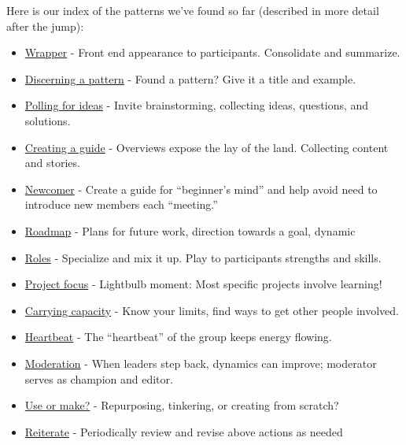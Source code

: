 Here is our index of the patterns we've found so far (described in more
detail after the jump):

\begin{itemize}
\item
  \href{http://peeragogy.org/patterns/wrapper/}{Wrapper} - Front end
  appearance to participants. Consolidate and summarize.
\item
  \href{http://peeragogy.org/patterns/discerning-a-pattern/}{Discerning
  a pattern} - Found a pattern? Give it a title and example.
\item
  \href{http://peeragogy.org/patterns/polling-for-ideas/}{Polling for
  ideas} - Invite brainstorming, collecting ideas, questions, and
  solutions.
\item
  \href{http://peeragogy.org/patterns/creating-a-guide/}{Creating a
  guide} - Overviews expose the lay of the land. Collecting content and
  stories.
\item
  \href{http://peeragogy.org/patterns/newcomer/}{Newcomer} - Create a
  guide for ``beginner's mind'' and help avoid need to introduce new
  members each ``meeting.''
\item
  \href{http://peeragogy.org/patterns/roadmap/}{Roadmap} - Plans for
  future work, direction towards a goal, dynamic
\item
  \href{http://peeragogy.org/patterns/roles/}{Roles} - Specialize and
  mix it up. Play to participants strengths and skills.
\item
  \href{http://peeragogy.org/focusing-on-a-specific-project/}{Project
  focus} - Lightbulb moment: Most specific projects involve learning!
\item
  \href{http://peeragogy.org/patterns/carrying-capacity/}{Carrying
  capacity} - Know your limits, find ways to get other people involved.
\item
  \href{http://peeragogy.org/patterns/heartbeat/}{Heartbeat} - The
  ``heartbeat'' of the group keeps energy flowing.
\item
  \href{http://peeragogy.org/patterns/moderation/}{Moderation} - When
  leaders step back, dynamics can improve; moderator serves as champion
  and editor.
\item
  \href{http://peeragogy.org/patterns/praxis-vs-poeisis/}{Use or make?}
  - Repurposing, tinkering, or creating from scratch?
\item
  \href{http://peeragogy.org/reiterate/}{Reiterate} - Periodically
  review and revise above actions as needed
\end{itemize}
